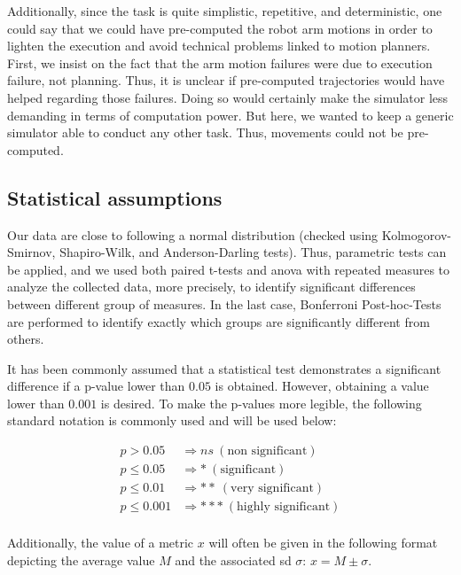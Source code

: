 Additionally, since the task is quite simplistic, repetitive, and deterministic, one could say that we could have pre-computed the robot arm motions in order to lighten the execution and avoid technical problems linked to motion planners. First, we insist on the fact that the arm motion failures were due to execution failure, not planning. Thus, it is unclear if pre-computed trajectories would have helped regarding those failures. Doing so would certainly make the simulator less demanding in terms of computation power. But here, we wanted to keep a generic simulator able to conduct any other task. Thus, movements could not be pre-computed.

\subsection{Statistical assumptions}

Our data are close to following a normal distribution (checked using Kolmogorov-Smirnov, Shapiro-Wilk, and Anderson-Darling tests). Thus, parametric tests can be applied, and we used both paired t-tests and \acrfull{anova} with repeated measures to analyze the collected data, more precisely, to identify significant differences between different group of measures. 
In the last case, Bonferroni Post-hoc-Tests are performed to identify exactly which groups are significantly different from others.

It has been commonly assumed that a statistical test demonstrates a significant difference if a p-value lower than $0.05$ is obtained. However, obtaining a value lower than $0.001$ is desired. To make the p-values more legible, the following standard notation is commonly used and will be used below:

\begin{align*}
    p > 0.05        & \Rightarrow ns ~ (\textrm{non significant})\\
    p \leq 0.05     & \Rightarrow * ~ (\textrm{significant})\\
    p \leq 0.01     & \Rightarrow ** ~ (\textrm{very significant})\\
    p \leq 0.001    & \Rightarrow *** ~ (\textrm{highly significant})\\
\end{align*}

Additionally, the value of a metric $x$ will often be given in the following format depicting the average value $M$ and the associated \acrfull{sd} $\sigma$: $x = M \pm \sigma$.


